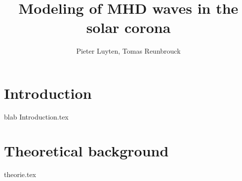 \documentclass[a4paper, 11pt]{article}
\title{Modeling of MHD waves in the solar corona}
\author{Pieter Luyten, Tomas Reunbrouck}
\begin{document}
\maketitle
\newpage
\tableofcontents
\newpage

\section{Introduction}
blab
{Introduction.tex}
\cite{notes-fluid-dynamics}

\section{Theoretical background}
{theorie.tex}

\printbibliography
\end{document}
